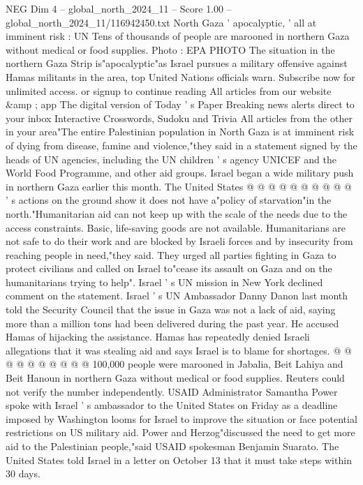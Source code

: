 \begin{textsample}{NEG Dim 4 – global\_north\_2024\_11 – Score 1.00 – global\_north\_2024\_11/116942450.txt}  \label{ex:f4_neg_177}
North Gaza ' apocalyptic, ' all at imminent risk : UN Tens of thousands of people are marooned in northern Gaza without medical or food supplies.
Photo : EPA PHOTO The situation in the northern Gaza Strip is"apocalyptic"as Israel pursues a military offensive against Hamas militants in the area, top United Nations officials warn.
Subscribe now for unlimited access. or signup to continue reading All articles from our website \&amp ; app The digital version of Today ' s Paper Breaking news alerts direct to your inbox Interactive Crosswords, Sudoku and Trivia All articles from the other in your area"The entire Palestinian population in North Gaza is at imminent risk of dying from disease, famine and violence,"they said in a statement signed by the heads of UN agencies, including the UN children ' s agency UNICEF and the World Food Programme, and other aid groups.
Israel began a wide military push in northern Gaza earlier this month.
The United States @ @ @ @ @ @ @ @ @ @ ' s actions on the ground show it does not have a"policy of starvation"in the north."Humanitarian aid can not keep up with the scale of the needs due to the access constraints.
Basic, life-saving goods are not available.
Humanitarians are not safe to do their work and are blocked by Israeli forces and by insecurity from reaching people in need,"they said.
They urged all parties fighting in Gaza to protect civilians and called on Israel to"cease its assault on Gaza and on the humanitarians trying to help".
Israel ' s UN mission in New York declined comment on the statement.
Israel ' s UN Ambassador Danny Danon last month told the Security Council that the issue in Gaza was not a lack of aid, saying more than a million tons had been delivered during the past year.
He accused Hamas of hijacking the assistance.
Hamas has repeatedly denied Israeli allegations that it was stealing aid and says Israel is to blame for shortages. @ @ @ @ @ @ @ @ @ @ 100,000 people were marooned in Jabalia, Beit Lahiya and Beit Hanoun in northern Gaza without medical or food supplies.
Reuters could not verify the number independently.
USAID Administrator Samantha Power spoke with Israel ' s ambassador to the United States on Friday as a deadline imposed by Washington looms for Israel to improve the situation or face potential restrictions on US military aid.
Power and Herzog"discussed the need to get more aid to the Palestinian people,"said USAID spokesman Benjamin Suarato.
The United States told Israel in a letter on October 13 that it must take steps within 30 days.

\end{textsample}
